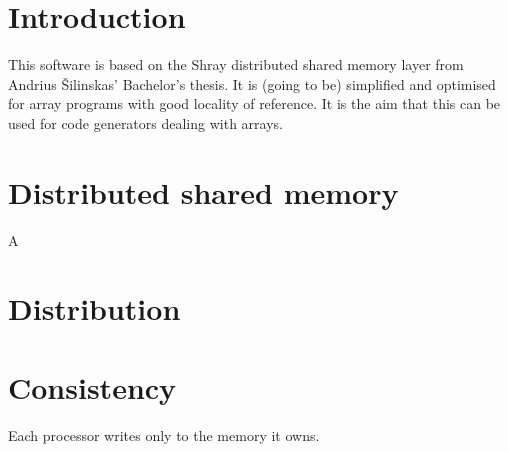 \documentclass{article}
\begin{document}
\section*{Introduction}

This software is based on the Shray distributed shared memory layer from Andrius Šilinskas'
Bachelor's thesis. It is (going to be) simplified and optimised for array programs with 
good locality of reference. It is the aim that this can be used for code generators dealing
with arrays. 

\section{Distributed shared memory}

A

\section{Distribution}

\section{Consistency}

Each processor writes only to the memory it owns. 
\end{document}
